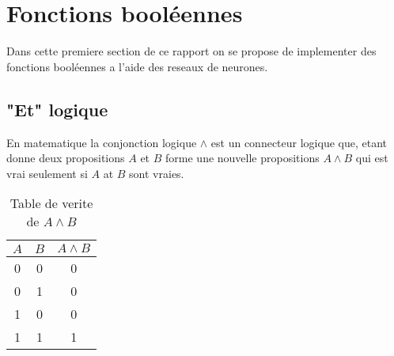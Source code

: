 \documentclass[twoside,openright,a4paper,11pt,french]{article}
\begin{document}
\pagestyle{plain}
\setlength{\parindent}{0pt}



\parskip=0pt
\tableofcontents


\vspace{5cm}


\section{Fonctions booléennes}

Dans cette premiere section de ce rapport on se propose
de implementer des fonctions booléennes a l'aide des reseaux
de neurones. 

\subsection{"Et" logique}

En matematique la conjonction logique $\land$ est un
connecteur logique que, etant donne deux propositions $A$ et $B$
forme une nouvelle propositions $A \land B$ qui est vrai seulement
si $A$ at $B$ sont vraies.

\begin{table}[h]
  \centering
  \begin{tabular}{| c | c | c |}
    \hline
    \textbf{$A$} & \textbf{$B$} & \textbf{$A \land B$}\\
    \hline
    0 & 0  & 0 \\
    \hline
    0 & 1  & 0 \\
    \hline
    1 & 0  & 0 \\
    \hline
    1 & 1  & 1 \\
    \hline
  \end{tabular}
  \caption{Table de verite de $A \land B$}
  \label{tab:et}
\end{table}










\end{document}
